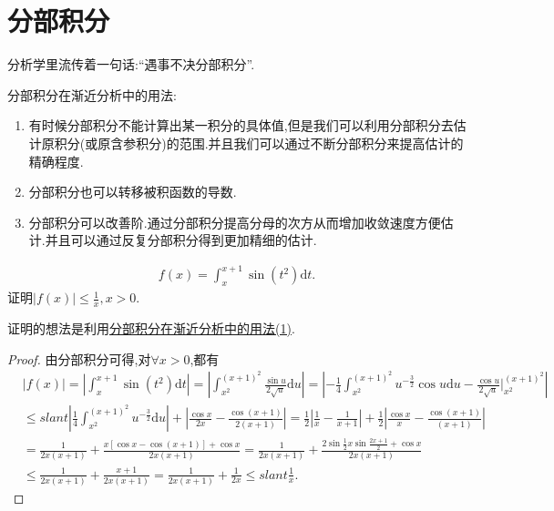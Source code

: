 \documentclass[../../main.tex]{subfiles}
\begin{document}
\section{分部积分}

分析学里流传着一句话:“遇事不决分部积分”.

分部积分在渐近分析中的用法:
\begin{enumerate}[(1)]
\item\label{分部积分在渐近分析中的用法(1)} 有时候分部积分不能计算出某一积分的具体值,但是我们可以利用分部积分去估计原积分(或原含参积分)的范围.并且我们可以通过不断分部积分来提高估计的精确程度.

\item\label{分部积分在渐近分析中的用法(2)} 分部积分也可以转移被积函数的导数.

\item\label{分部积分在渐近分析中的用法(3)} 分部积分可以改善阶.通过分部积分提高分母的次方从而增加收敛速度方便估计.并且可以通过反复分部积分得到更加精细的估计.
\end{enumerate}

\begin{example}
\begin{align*}
f\left( x \right) =\int_x^{x+1}{\sin \left( t^2 \right) \mathrm{d}t}.
\end{align*}
证明$\left| f\left( x \right) \right|\le \frac{1}{x},x>0$.
\end{example}
\begin{note}
证明的想法是利用\hyperref[分部积分在渐近分析中的用法(1)]{分部积分在渐近分析中的用法(1)}.
\end{note}
\begin{proof}
由分部积分可得,对$\forall x>0$,都有
\begin{align*}
&\left| f\left( x \right) \right|=\left| \int_x^{x+1}{\sin \left( t^2 \right) \mathrm{d}t} \right|=\left| \int_{x^2}^{\left( x+1 \right) ^2}{\frac{\sin u}{2\sqrt{u}}\mathrm{d}u} \right|=\left| -\frac{1}{4}\int_{x^2}^{\left( x+1 \right) ^2}{u^{-\frac{3}{2}}\cos u\mathrm{d}u}-\frac{\cos u}{2\sqrt{u}}\Big|_{x^2}^{\left( x+1 \right) ^2} \right|
\\
&\leqslant slant \left| \frac{1}{4}\int_{x^2}^{\left( x+1 \right) ^2}{u^{-\frac{3}{2}}\mathrm{d}u} \right|+\left| \frac{\cos x}{2x}-\frac{\cos \left( x+1 \right)}{2\left( x+1 \right)} \right|=\frac{1}{2}\left| \frac{1}{x}-\frac{1}{x+1} \right|+\frac{1}{2}\left| \frac{\cos x}{x}-\frac{\cos \left( x+1 \right)}{\left( x+1 \right)} \right|
\\
&=\frac{1}{2x\left( x+1 \right)}+\frac{x\left[ \cos x-\cos \left( x+1 \right) \right] +\cos x}{2x\left( x+1 \right)}=\frac{1}{2x\left( x+1 \right)}+\frac{2\sin \frac{1}{2}x\sin \frac{2x+1}{2}+\cos x}{2x\left( x+1 \right)}
\\
&\le \frac{1}{2x\left( x+1 \right)}+\frac{x+1}{2x\left( x+1 \right)}=\frac{1}{2x\left( x+1 \right)}+\frac{1}{2x}\leqslant slant \frac{1}{x}.
\end{align*}
\end{proof}
\end{document}
